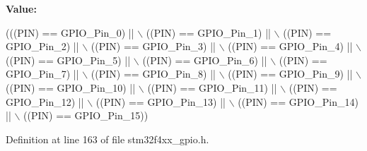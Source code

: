 {\bfseries Value\+:}
\begin{DoxyCode}
(((PIN) == GPIO\_Pin\_0) || \(\backslash\)
                              ((PIN) == GPIO\_Pin\_1) || \(\backslash\)
                              ((PIN) == GPIO\_Pin\_2) || \(\backslash\)
                              ((PIN) == GPIO\_Pin\_3) || \(\backslash\)
                              ((PIN) == GPIO\_Pin\_4) || \(\backslash\)
                              ((PIN) == GPIO\_Pin\_5) || \(\backslash\)
                              ((PIN) == GPIO\_Pin\_6) || \(\backslash\)
                              ((PIN) == GPIO\_Pin\_7) || \(\backslash\)
                              ((PIN) == GPIO\_Pin\_8) || \(\backslash\)
                              ((PIN) == GPIO\_Pin\_9) || \(\backslash\)
                              ((PIN) == GPIO\_Pin\_10) || \(\backslash\)
                              ((PIN) == GPIO\_Pin\_11) || \(\backslash\)
                              ((PIN) == GPIO\_Pin\_12) || \(\backslash\)
                              ((PIN) == GPIO\_Pin\_13) || \(\backslash\)
                              ((PIN) == GPIO\_Pin\_14) || \(\backslash\)
                              ((PIN) == GPIO\_Pin\_15))
\end{DoxyCode}


Definition at line 163 of file stm32f4xx\+\_\+gpio.\+h.

